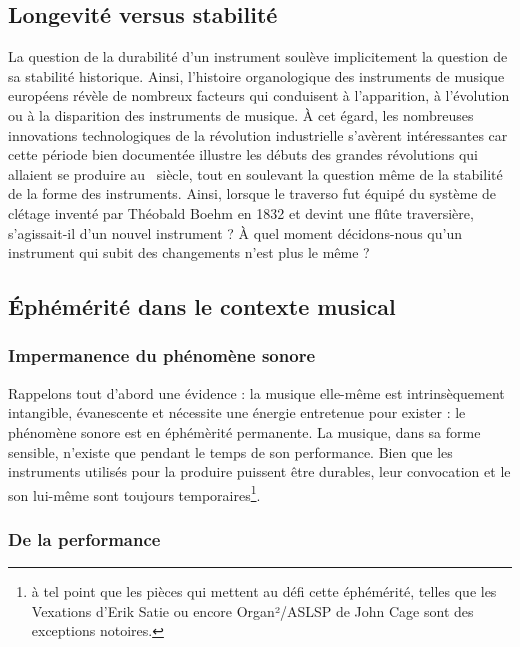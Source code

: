 \subsection{Longevité versus stabilité}
\label{sec:ephemeral:longevity_stability}

\noindent La question de la durabilité d'un instrument soulève implicitement la question de sa stabilité historique. Ainsi, l'histoire organologique des instruments de musique européens révèle de nombreux facteurs qui conduisent à l'apparition, à l'évolution ou à la disparition des instruments de musique. À cet égard, les nombreuses innovations technologiques de la révolution industrielle s'avèrent intéressantes car cette période bien documentée illustre les débuts des grandes révolutions qui allaient se produire au ~siècle, tout en soulevant la question même de la stabilité de la forme des instruments. Ainsi, lorsque le traverso fut équipé du système de clétage inventé par Théobald Boehm en 1832 et devint une flûte traversière, s'agissait-il d'un nouvel instrument ? À quel moment décidons-nous qu'un instrument qui subit des changements n'est plus le même ?

\subsection{Éphémérité dans le contexte musical}
\label{sec:ephemeral:ephemerality_in_musical_context}

\subsubsection{Impermanence du phénomène sonore}
\noindent Rappelons tout d'abord une évidence : la musique elle-même est intrinsèquement intangible, évanescente et nécessite une énergie entretenue pour exister : le phénomène sonore est en éphémèrité permanente. La musique, dans sa forme sensible, n'existe que pendant le temps de son performance. Bien que les instruments utilisés pour la produire puissent être durables, leur convocation et le son lui-même sont toujours temporaires\footnote{à tel point que les pièces qui mettent au défi cette éphémérité, telles que les Vexations d'Erik Satie ou encore Organ²/ASLSP de John Cage sont des exceptions notoires.}.

\subsubsection{De la performance}

